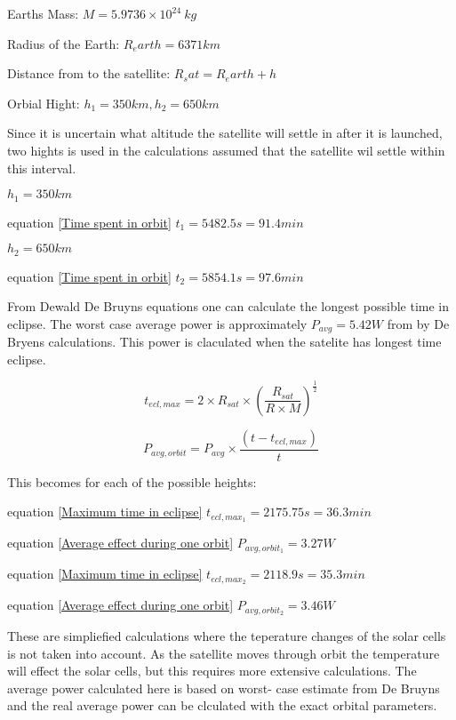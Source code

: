 Earths Mass: $M = 5.9736\times 10^{24}\ kg$

Radius of the Earth: $R_earth = 6371 km$

Distance from to the satellite: $R_sat = R_earth + h$

Orbial Hight: $h_1 = 350km, h_2=650km $

\vspace{5 mm}Since it is uncertain what altitude the satellite will settle in after it is launched, two hights is used in the calculations assumed that the satellite wil settle within this interval.

\vspace{5 mm}$h_1 = 350km$

equation \ref{Time spent in orbit} 
$t_1 = 5482.5 s = 91.4 min$

\vspace{5 mm}$h_2 = 650km$

equation \ref{Time spent in orbit} $t_2 = 5854.1 s = 97.6 min$

\vspace{5 mm}From Dewald De Bruyns equations one can calculate the longest possible time in eclipse. The worst case average power is approximately $P_{avg} = 5.42 W$ from by De Bryens calculations. This power is claculated when the satelite has longest time eclipse.

\begin{equation}t_{ecl,max} = 2\times R_{sat}\times(\frac{R_{sat}}{R\times M})^{\frac{1}{2}}
\label{Maximum time in eclipse}
\end{equation}

\begin{equation}P_{avg,orbit} = P_{avg}\times\frac{(t-t_{ecl,max})}{t}
\label{Average effect during one orbit}
\end{equation}

\vspace{5 mm}This becomes for each of the possible heights:

equation \ref{Maximum time in eclipse}
$t_{ecl,max_1} = 2175.75 s = 36.3 min$

equation \ref{Average effect during one orbit}
$P_{avg,orbit_1} = 3.27W$

equation \ref{Maximum time in eclipse}
$t_{ecl,max_2} = 2118.9 s = 35.3 min$

equation \ref{Average effect during one orbit}
$P_{avg,orbit_2} = 3.46W$

\vspace{5 mm}These are simpliefied calculations where the teperature changes of the solar cells is not taken into account. As the satellite moves through orbit the temperature will effect the solar cells, but this requires more extensive calculations. The average power calculated here is based on worst- case estimate from De Bruyns and the real average power can be clculated with the exact orbital parameters. 

